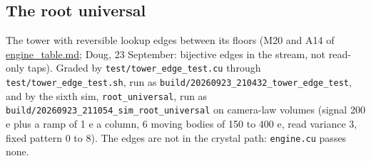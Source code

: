 \subsection{\texorpdfstring{The root universal}{The root universal}}

The tower with reversible lookup edges between its floors (M20 and A14 of \hyperref[chap:engine-table]{engine\_\allowbreak{}table.md}; Doug, 23 September: bijective edges in the stream, not read-only taps). Graded by \texttt{test/\allowbreak{}tower\_\allowbreak{}edge\_\allowbreak{}test.\allowbreak{}cu} through \texttt{test/\allowbreak{}tower\_\allowbreak{}edge\_\allowbreak{}test.\allowbreak{}sh}, run as \texttt{build/\allowbreak{}20260923\_\allowbreak{}210432\_\allowbreak{}tower\_\allowbreak{}edge\_\allowbreak{}test}, and by the sixth sim, \texttt{root\_\allowbreak{}universal}, run as \texttt{build/\allowbreak{}20260923\_\allowbreak{}211054\_\allowbreak{}sim\_\allowbreak{}root\_\allowbreak{}universal} on camera-law volumes (signal 200 e plus a ramp of 1 e a column, 6 moving bodies of 150 to 400 e, read variance 3, fixed pattern 0 to 8). The edges are not in the crystal path: \texttt{engine.\allowbreak{}cu} passes none.

